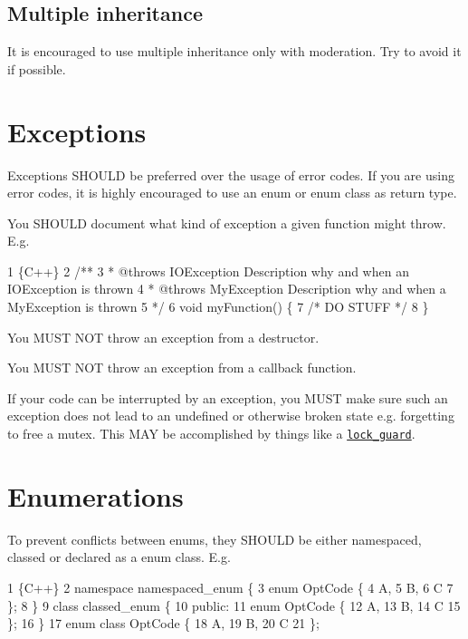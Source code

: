 \subsection*{Multiple inheritance}

It is encouraged to use multiple inheritance only with moderation. Try to avoid it if possible.

\section*{Exceptions}

Exceptions S\+H\+O\+U\+LD be preferred over the usage of error codes. If you are using error codes, it is highly encouraged to use an {\ttfamily enum} or {\ttfamily enum class} as return type.

You S\+H\+O\+U\+LD document what kind of exception a given function might throw. E.\+g. 
\begin{DoxyCode}
1 \{C++\}
2 /**
3  * @throws IOException Description why and when an IOException is thrown
4  * @throws MyException Description why and when a MyException is thrown
5  */
6 void myFunction() \{
7     /* DO STUFF */
8 \}
\end{DoxyCode}


You M\+U\+ST N\+OT throw an exception from a destructor.

You M\+U\+ST N\+OT throw an exception from a callback function.

If your code can be interrupted by an exception, you M\+U\+ST make sure such an exception does not lead to an undefined or otherwise broken state e.\+g. forgetting to free a {\ttfamily mutex}. This M\+AY be accomplished by things like a \href{https://en.cppreference.com/w/cpp/thread/lock_guard}{\tt lock\+\_\+guard}.

\section*{Enumerations}

To prevent conflicts between enums, they S\+H\+O\+U\+LD be either namespaced, classed or declared as a {\ttfamily enum class}. E.\+g. 
\begin{DoxyCode}
1 \{C++\}
2 namespace namespaced\_enum \{
3     enum OptCode \{
4         A,
5         B,
6         C
7     \};
8 \}
9 class classed\_enum \{
10     public:
11     enum OptCode \{
12         A,
13         B,
14         C
15     \};
16 \}
17 enum class OptCode \{
18     A,
19     B,
20     C
21 \};
\end{DoxyCode}


